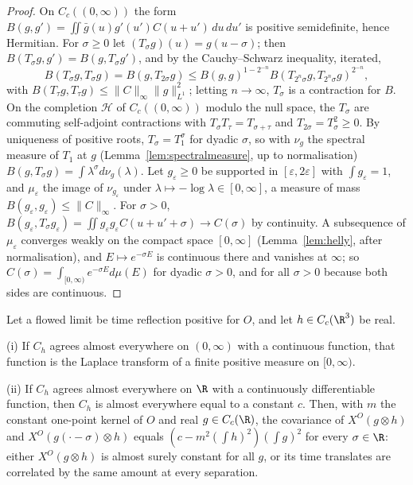 \begin{proof}
On $C_c((0,\infty))$ the form $B(g,g')=\iint\bar g(u)g'(u')C(u+u')\,du\,du'$
is positive semidefinite, hence Hermitian. For $\sigma\ge0$ let $(T_\sigma g)(u)=g(u-
\sigma)$; then $B(T_\sigma g,g')=B(g,T_\sigma g')$, and by the Cauchy--Schwarz
inequality, iterated,
\[
B(T_\sigma g,T_\sigma g)=B(g,T_{2\sigma}g)\le B(g,g)^{1-2^{-n}}
B(T_{2^n\sigma}g,T_{2^n\sigma}g)^{2^{-n}},
\]
with $B(T_\tau g,T_\tau g)\le\|C\|_\infty\|g\|_{L^1}^2$; letting $n\to\infty$,
$T_\sigma$ is a contraction for $B$. On the completion $\mathcal H$ of
$C_c((0,\infty))$ modulo the null space, the $T_\sigma$ are commuting
self-adjoint contractions with $T_\sigma T_\tau=T_{\sigma+\tau}$ and
$T_{2\sigma}=T_\sigma^2\ge0$. By uniqueness of positive roots, $T_\sigma=T_1^\sigma$
for dyadic $\sigma$, so with $\nu_g$ the spectral measure of $T_1$ at $g$
(Lemma~\ref{lem:spectralmeasure}, up to normalisation) $B(g,T_\sigma g)=
\int\lambda^\sigma d\nu_g(\lambda)$. Let $g_\varepsilon\ge0$ be supported in
$[\varepsilon,2\varepsilon]$ with $\int g_\varepsilon=1$, and $\mu_\varepsilon$
the image of $\nu_{g_\varepsilon}$ under $\lambda\mapsto-\log\lambda\in[0,
\infty]$, a measure of mass $B(g_\varepsilon,g_\varepsilon)\le\|C\|_\infty$.
For $\sigma>0$, $B(g_\varepsilon,T_\sigma g_\varepsilon)=\iint g_\varepsilon
g_\varepsilon C(u+u'+\sigma)\to C(\sigma)$ by continuity. A subsequence of
$\mu_\varepsilon$ converges weakly on the compact space $[0,\infty]$
(Lemma~\ref{lem:helly}, after normalisation), and $E\mapsto e^{-\sigma E}$ is
continuous there and vanishes at $\infty$; so $C(\sigma)=\int_{[0,\infty)}
e^{-\sigma E}d\mu(E)$ for dyadic $\sigma>0$, and for all $\sigma>0$ because
both sides are continuous.
\end{proof}

\begin{theorem}\label{rF13:smooth}
Let a flowed limit be time reflection positive for $O$, and let $h\in
C_c(\R^3)$ be real.

\textup{(i)} If $C_h$ agrees almost everywhere on $(0,\infty)$ with a
continuous function, that function is the Laplace transform of a finite
positive measure on $[0,\infty)$.

\textup{(ii)} If $C_h$ agrees almost everywhere on $\R$ with a continuously
differentiable function, then $C_h$ is almost everywhere equal to a constant
$c$. Then, with $m$ the constant one-point kernel of $O$ and real $g\in
C_c(\R)$, the covariance of $X^O(g\otimes h)$ and $X^O(g(\cdot-\sigma)\otimes
h)$ equals $(c-m^2(\int h)^2)(\int g)^2$ for every $\sigma\in\R$: either
$X^O(g\otimes h)$ is almost surely constant for all $g$, or its time
translates are correlated by the same amount at every separation.
\end{theorem}

